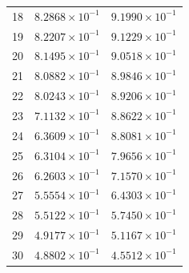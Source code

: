 \begin{table}[H]
\begin{tabular}{@{}rrr@{}}
18 & $8.2868\times10^{-1}$ & $9.1990\times10^{-1}$\\
19 & $8.2207\times10^{-1}$ & $9.1229\times10^{-1}$\\
20 & $8.1495\times10^{-1}$ & $9.0518\times10^{-1}$\\
21 & $8.0882\times10^{-1}$ & $8.9846\times10^{-1}$\\
22 & $8.0243\times10^{-1}$ & $8.9206\times10^{-1}$\\
23 & $7.1132\times10^{-1}$ & $8.8622\times10^{-1}$\\
24 & $6.3609\times10^{-1}$ & $8.8081\times10^{-1}$\\
25 & $6.3104\times10^{-1}$ & $7.9656\times10^{-1}$\\
26 & $6.2603\times10^{-1}$ & $7.1570\times10^{-1}$\\
27 & $5.5554\times10^{-1}$ & $6.4303\times10^{-1}$\\
28 & $5.5122\times10^{-1}$ & $5.7450\times10^{-1}$\\
29 & $4.9177\times10^{-1}$ & $5.1167\times10^{-1}$\\
30 & $4.8802\times10^{-1}$ & $4.5512\times10^{-1}$\\
\bottomrule
\end{tabular}
\end{table}

